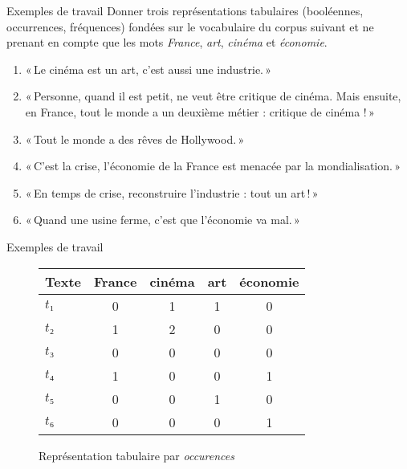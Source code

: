 \documentclass[../allslides.tex]{subfiles}
\begin{document}
\renewcommand\docdate{2021-02-18}  %



\begin{frame}{Exemples de travail}
	Donner trois représentations tabulaires (booléennes, occurrences, fréquences) fondées sur le vocabulaire du corpus suivant et ne prenant en compte que les mots \emph{France}, \emph{art}, \emph{cinéma} et \emph{économie}.
	\begin{enumerate}
		\item « Le cinéma est un art, c’est aussi une industrie. »
		\item « Personne, quand il est petit, ne veut être critique de cinéma. Mais ensuite, en France, tout le monde a un deuxième métier : critique de cinéma ! »
		\item « Tout le monde a des rêves de Hollywood. »
		\item « C’est la crise, l’économie de la France est menacée par la mondialisation. »
		\item « En temps de crise, reconstruire l’industrie : tout un art ! »
		\item « Quand une usine ferme, c’est que l’économie va mal. »
	\end{enumerate}
\end{frame}


\begin{frame}{Exemples de travail}
	\begin{figure}
		\caption{Représentation tabulaire par \emph{occurences}}
		\begin{tabular}{l*{4}{S}}
			\toprule
			\textbf{Texte} & {\textbf{France}} & {\textbf{cinéma}} & {\textbf{art}} & {\textbf{économie}}\\
			\midrule
			\(t₁\) & 0 & 1 & 1 & 0\\
			\(t₂\) & 1 & 2 & 0 & 0\\
			\(t₃\) & 0 & 0 & 0 & 0\\
			\(t₄\) & 1 & 0 & 0 & 1\\
			\(t₅\) & 0 & 0 & 1 & 0\\
			\(t₆\) & 0 & 0 & 0 & 1\\
			\bottomrule
		\end{tabular}
	\end{figure}
\end{frame}
\end{document}
